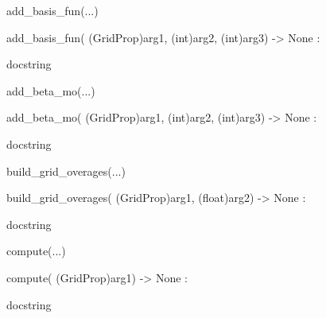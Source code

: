 \documentclass[letterpaper,10pt,english]{sphinxmanual}
\begin{document}
\begin{description}
\begin{description}
\begin{DUlineblock}{0em}
\begin{DUlineblock}{\DUlineblockindent}
\begin{DUlineblock}{\DUlineblockindent}
\item[] 
\end{DUlineblock}
\end{DUlineblock}
\item[] add\_basis\_fun(...)
\item[]
\begin{DUlineblock}{\DUlineblockindent}
\item[] add\_basis\_fun( (GridProp)arg1, (int)arg2, (int)arg3) -\textgreater{} None :
\item[]
\begin{DUlineblock}{\DUlineblockindent}
\item[] docstring
\item[] 
\end{DUlineblock}
\end{DUlineblock}
\item[] add\_beta\_mo(...)
\item[]
\begin{DUlineblock}{\DUlineblockindent}
\item[] add\_beta\_mo( (GridProp)arg1, (int)arg2, (int)arg3) -\textgreater{} None :
\item[]
\begin{DUlineblock}{\DUlineblockindent}
\item[] docstring
\item[] 
\end{DUlineblock}
\end{DUlineblock}
\item[] build\_grid\_overages(...)
\item[]
\begin{DUlineblock}{\DUlineblockindent}
\item[] build\_grid\_overages( (GridProp)arg1, (float)arg2) -\textgreater{} None :
\item[]
\begin{DUlineblock}{\DUlineblockindent}
\item[] docstring
\item[] 
\end{DUlineblock}
\end{DUlineblock}
\item[] compute(...)
\item[]
\begin{DUlineblock}{\DUlineblockindent}
\item[] compute( (GridProp)arg1) -\textgreater{} None :
\item[]
\begin{DUlineblock}{\DUlineblockindent}
\item[] docstring

\end{DUlineblock}
\end{DUlineblock}
\end{DUlineblock}
\end{description}
\end{description}
\end{document}
